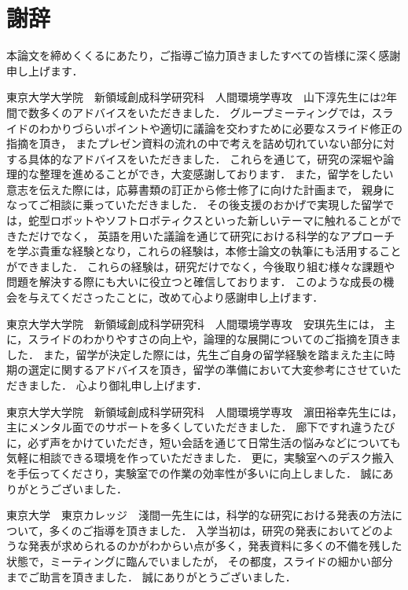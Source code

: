 \documentclass[../main]{subfiles}
\begin{document}
\chapter*{謝辞}
\label{thankyou}

\lhead[謝辞]{}
\thispagestyle{empty}

\newpage


本論文を締めくくるにあたり，ご指導ご協力頂きましたすべての皆様に深く感謝申し上げます．

東京大学大学院　新領域創成科学研究科　人間環境学専攻　山下淳先生には2年間で数多くのアドバイスをいただきました．
グループミーティングでは，スライドのわかりづらいポイントや適切に議論を交わすために必要なスライド修正の指摘を頂き，
またプレゼン資料の流れの中で考えを詰め切れていない部分に対する具体的なアドバイスをいただきました．
これらを通じて，研究の深堀や論理的な整理を進めることができ，大変感謝しております．
また，留学をしたい意志を伝えた際には，応募書類の訂正から修士修了に向けた計画まで，
親身になってご相談に乗っていただきました．
その後支援のおかげで実現した留学では，蛇型ロボットやソフトロボティクスといった新しいテーマに触れることができただけでなく，
英語を用いた議論を通じて研究における科学的なアプローチを学ぶ貴重な経験となり，これらの経験は，本修士論文の執筆にも活用することができました．
これらの経験は，研究だけでなく，今後取り組む様々な課題や問題を解決する際にも大いに役立つと確信しております．
このような成長の機会を与えてくださったことに，改めて心より感謝申し上げます．


東京大学大学院　新領域創成科学研究科　人間環境学専攻　安琪先生には，
主に，スライドのわかりやすさの向上や，論理的な展開についてのご指摘を頂きました．
また，留学が決定した際には，先生ご自身の留学経験を踏まえた主に時期の選定に関するアドバイスを頂き，留学の準備において大変参考にさせていただきました．
心より御礼申し上げます．

東京大学大学院　新領域創成科学研究科　人間環境学専攻　濵田裕幸先生には，主にメンタル面でのサポートを多くしていただきました．
廊下ですれ違うたびに，必ず声をかけていただき，短い会話を通じて日常生活の悩みなどについても気軽に相談できる環境を作っていただきました．
更に，実験室へのデスク搬入を手伝ってくださり，実験室での作業の効率性が多いに向上しました．
誠にありがとうございました．

東京大学　東京カレッジ　淺間一先生には，科学的な研究における発表の方法について，多くのご指導を頂きました．
入学当初は，研究の発表においてどのような発表が求められるのかがわからい点が多く，発表資料に多くの不備を残した状態で，ミーティングに臨んでいましたが，
その都度，スライドの細かい部分までご助言を頂きました．
誠にありがとうございました．
\end{document}
